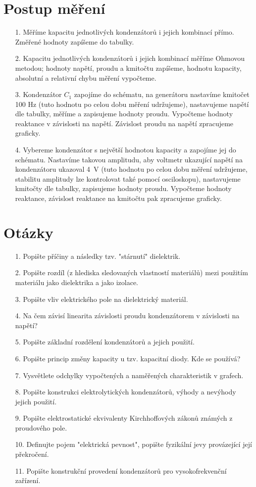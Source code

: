 \documentclass[a4paper,12pt]{report}
\begin{document}
\chapter*{Postup měření}
\begin{itemize}
 \item [1.]{ Měříme kapacitu jednotlivých kondenzátorů i jejich kombinací přímo. Změřené hodnoty zapíšeme do tabulky.}
 \item [2.]{Kapacitu jednotlivých kondenzátorů i jejich kombinací měříme Ohmovou metodou; hodnoty napětí, proudu a kmitočtu zapíšeme, hodnotu kapacity, absolutní a relativní chybu měření vypočteme.}
 \item [3.]{Kondenzátor $C_1$ zapojíme do schématu, na generátoru nastavíme kmitočet 100 Hz (tuto hodnotu po celou dobu měření udržujeme), nastavujeme napětí dle tabulky, měříme a zapisujeme hodnoty proudu. Vypočteme hodnoty reaktance v závislosti na napětí. Závislost proudu na napětí zpracujeme graficky.}
 \item [4.]{Vybereme kondenzátor s největší hodnotou kapacity a zapojíme jej do schématu. Nastavíme takovou amplitudu, aby voltmetr ukazující napětí na kondenzátoru ukazoval 4~V (tuto hodnotu po celou dobu měření udržujeme, stabilitu amplitudy lze kontrolovat také pomocí osciloskopu), nastavujeme kmitočty dle tabulky, zapisujeme hodnoty proudu. Vypočteme hodnoty reaktance, závislost reaktance na kmitočtu pak zpracujeme graficky.}
\end{itemize}
\newpage
\chapter*{Otázky}
\begin{itemize}
 \item [1.]{Popište příčiny a následky tzv. "stárnutí" dielektrik.}
 \item [2.]{Popište rozdíl (z hlediska sledovaných vlastností materiálů) mezi použitím materiálu jako dielektrika a jako izolace.}
 \item [3.]{Popište vliv elektrického pole na dielektrický materiál.}
 \item [4.]{Na čem závisí linearita závislosti proudu kondenzátorem v závislosti na napětí?}
 \item [5.]{Popište základní rozdělení kondenzátorů a jejich použití.}
 \item [6.]{Popište princip změny kapacity u tzv. kapacitní diody. Kde se používá?}
 \item [7.]{Vysvětlete odchylky vypočtených a naměřených charakteristik v grafech.}
 \item [8.]{Popište konstrukci elektrolytických kondenzátorů, výhody a nevýhody jejich použití.}
 \item [9.]{Popište elektrostatické ekvivalenty Kirchhoffových zákonů známých z proudového pole.}
 \item [10.]{Definujte pojem "elektrická pevnost", popište fyzikální jevy provázející její překročení.}
 \item [11.]{Popište konstrukční provedení kondenzátorů pro vysokofrekvenční zařízení.}
\end{itemize}
\newpage
\end{document}
